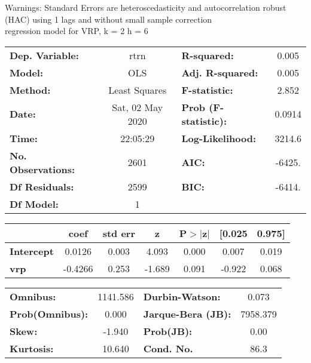 Warnings: \newline
 [1] Standard Errors are heteroscedasticity and autocorrelation robust (HAC) using 1 lags and without small sample correction\\ 

regression model for VRP, k = 2 h = 6\begin{center}
\begin{tabular}{lclc}
\toprule
\textbf{Dep. Variable:}    &       rtrn       & \textbf{  R-squared:         } &     0.005   \\
\textbf{Model:}            &       OLS        & \textbf{  Adj. R-squared:    } &     0.005   \\
\textbf{Method:}           &  Least Squares   & \textbf{  F-statistic:       } &     2.852   \\
\textbf{Date:}             & Sat, 02 May 2020 & \textbf{  Prob (F-statistic):} &   0.0914    \\
\textbf{Time:}             &     22:05:29     & \textbf{  Log-Likelihood:    } &    3214.6   \\
\textbf{No. Observations:} &        2601      & \textbf{  AIC:               } &    -6425.   \\
\textbf{Df Residuals:}     &        2599      & \textbf{  BIC:               } &    -6414.   \\
\textbf{Df Model:}         &           1      & \textbf{                     } &             \\
\bottomrule
\end{tabular}
\begin{tabular}{lcccccc}
                   & \textbf{coef} & \textbf{std err} & \textbf{z} & \textbf{P$> |$z$|$} & \textbf{[0.025} & \textbf{0.975]}  \\
\midrule
\textbf{Intercept} &       0.0126  &        0.003     &     4.093  &         0.000        &        0.007    &        0.019     \\
\textbf{vrp}       &      -0.4266  &        0.253     &    -1.689  &         0.091        &       -0.922    &        0.068     \\
\bottomrule
\end{tabular}
\begin{tabular}{lclc}
\textbf{Omnibus:}       & 1141.586 & \textbf{  Durbin-Watson:     } &    0.073  \\
\textbf{Prob(Omnibus):} &   0.000  & \textbf{  Jarque-Bera (JB):  } & 7958.379  \\
\textbf{Skew:}          &  -1.940  & \textbf{  Prob(JB):          } &     0.00  \\
\textbf{Kurtosis:}      &  10.640  & \textbf{  Cond. No.          } &     86.3  \\
\bottomrule
\end{tabular}
\end{center}

